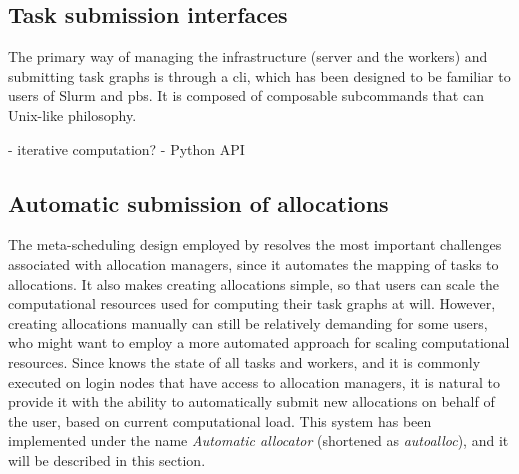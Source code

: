 \subsection{Task submission interfaces}
The primary way of managing the \hyperqueue{} infrastructure (server and the workers)
and submitting task graphs is through a \gls{cli}, which has been designed to be familiar
to users of Slurm and \gls{pbs}. It is composed of composable subcommands that can
Unix-like philosophy.

- iterative computation?
- Python API


\subsection{Automatic submission of allocations}
The meta-scheduling design employed by \hyperqueue{} resolves the most important
challenges associated with allocation managers, since it automates the mapping of tasks to
allocations. It also makes creating allocations simple, so that
users can scale the computational resources used for computing their task graphs at will. However,
creating allocations manually can still be relatively demanding for some users, who might want to
employ a more automated approach for scaling computational resources. Since \hyperqueue{}
knows the state of all tasks and workers, and it is commonly executed on login nodes that have
access to allocation managers, it is natural to provide it with the ability to
automatically submit new allocations on behalf of the user, based on current computational load.
This system has been implemented under the name
\emph{Automatic allocator} (shortened as \emph{autoalloc}), and it will be described in this
section.


